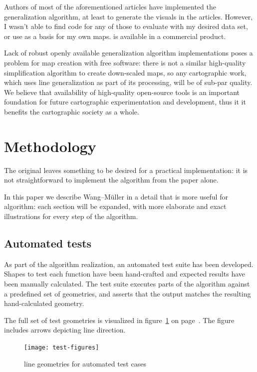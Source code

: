 \documentclass[a4paper]{article}
\newcommand{\WM}{Wang--M{\"u}ller}
\begin{document}
Authors of most of the aforementioned articles have implemented the
generalization algorithm, at least to generate the visuals in the articles.
However, I wasn't able to find code for any of those to evaluate with my
desired data set, or use as a basis for my own maps. \cite{wang1998line} is
available in a commercial product.

Lack of robust openly available generalization algorithm implementations poses
a problem for map creation with free software: there is not a similar
high-quality simplification algorithm to create down-scaled maps, so any
cartographic work, which uses line generalization as part of its processing,
will be of sub-par quality. We believe that availability of high-quality
open-source tools is an important foundation for future cartographic
experimentation and development, thus it it benefits the cartographic society
as a whole.

\section{Methodology}
\label{sec:methodology}

The original \cite{wang1998line} leaves something to be desired for a practical
implementation: it is not straightforward to implement the algorithm from the
paper alone.

In this paper we describe {\WM} in a detail that is more useful for algorithm:
each section will be expanded, with more elaborate and exact illustrations for
every step of the algorithm.

\subsection{Automated tests}

As part of the algorithm realization, an automated test suite has been
developed. Shapes to test each function have been hand-crafted and expected
results have been manually calculated. The test suite executes parts of the
algorithm against a predefined set of geometries, and asserts that the output
matches the resulting hand-calculated geometry.

The full set of test geometries is visualized in figure~\ref{fig:test-figures}
on page~\pageref{fig:test-figures}. The figure includes arrows depicting
line direction.

\begin{figure}[H]
    \centering
    \texttt{[image: test-figures]}
    \caption{line geometries for automated test cases}
    \label{fig:test-figures}
\end{figure}
\end{document}
